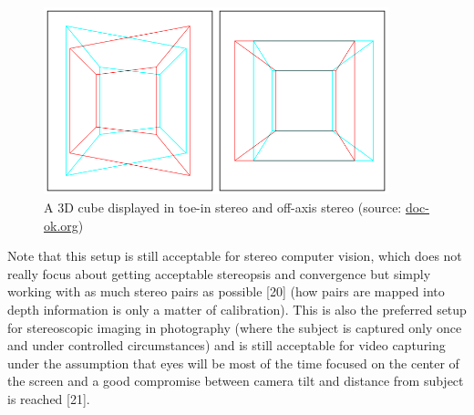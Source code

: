 \begin{figure}
\centering
\includegraphics[width=10cm]{pictures/keystoning}
\caption{A 3D cube displayed in toe-in stereo and off-axis stereo (source: \href{http://doc-ok.org/?p=77} {doc-ok.org})}
\label{fig:keystoning}
\end{figure}

Note that this setup is still acceptable for stereo computer vision, which does not really focus about getting acceptable stereopsis and convergence but simply working with as much stereo pairs as possible [20] (how pairs are mapped into depth information is only a matter of calibration). This is also the preferred setup for stereoscopic imaging in photography (where the subject is captured only once and under controlled circumstances) and is still acceptable for video capturing under the assumption that eyes will be most of the time focused on the center of the screen and a good compromise between camera tilt and distance from subject is reached [21].

